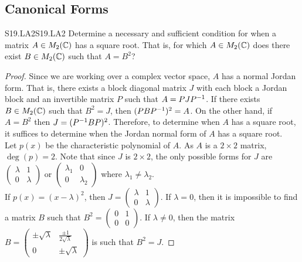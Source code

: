 \documentclass[../../AlgebraQualSolutions.tex]{subfiles}
\begin{document}
\subsection{Canonical Forms}

\begin{prob}{S19.LA2}{S19.LA2}
    Determine a necessary and sufficient condition for when a matrix $A \in M_2(\mathbb{C})$ has a square root. That is, for which $A \in M_2(\mathbb{C})$ does there exist $B \in M_2(\mathbb{C})$ such that $A = B^2$?
\end{prob}

\begin{proof}
    Since we are working over a complex vector space, $A$ has a normal Jordan form. That is, there exists a block diagonal matrix $J$ with each block a  Jordan block and an invertible matrix $P$ such that $A = P J P^{-1}$. If there exists $B \in M_2(\mathbb{C})$ such that $B^2 = J$, then $(PBP^{-1})^2 = A$. On the other hand, if $A = B^2$ then $J = (P^{-1} B P)^2$. Therefore, to determine when $A$ has a square root, it suffices to determine when the Jordan normal form of $A$ has a square root.\\
    
    
    Let $p(x)$ be the characteristic polynomial of $A$. As $A$ is a $2 \times 2$ matrix, $\deg(p) = 2$. Note that since $J$ is $2 \times 2$, the only possible forms for $J$ are $\begin{pmatrix} \lambda & 1\\ 0 & \lambda \end{pmatrix}$ or $\begin{pmatrix} \lambda_1 & 0\\ 0 & \lambda_2 \end{pmatrix}$ where $\lambda_1 \neq \lambda_2$.\\ 
    
    If $p(x) = (x-\lambda)^2$, then $J = \begin{pmatrix} \lambda & 1\\ 0 & \lambda \end{pmatrix}$.  If $\lambda = 0$, then it is impossible to find a matrix $B$ such that $B^2 = \begin{pmatrix} 0 & 1\\ 0 & 0 \end{pmatrix}$. If $\lambda \neq 0$, then the matrix $B = \begin{pmatrix} \pm \sqrt\lambda & \frac{\pm1}{2 \sqrt \lambda}\\ 0 & \pm \sqrt\lambda \end{pmatrix}$ is such that $B^2 = J$.
    

\end{proof}
\end{document}
